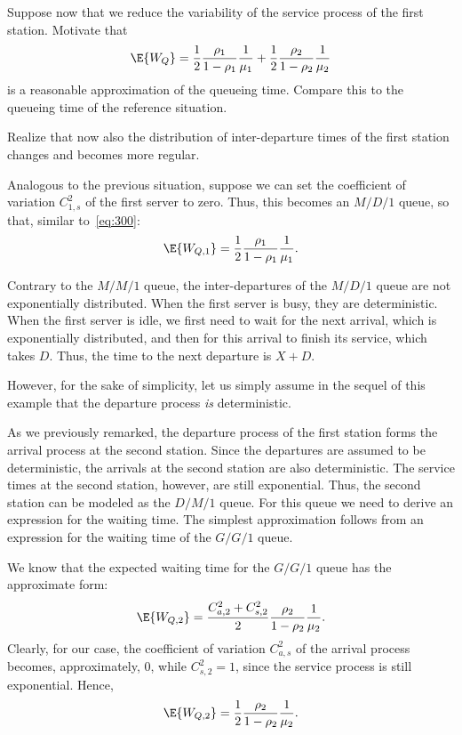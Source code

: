 \begin{exercise}
Suppose now that we reduce the variability of the service process of the first station.
Motivate that 
\begin{equation*}
  \E{W_Q}= \frac12\frac{\rho_1}{1-\rho_1} \frac1{\mu_1} +
  \frac12\frac{\rho_2}{1-\rho_2} \frac1{\mu_2}
\end{equation*}
is a reasonable approximation of the queueing time. Compare this to the queueing time of the reference situation.
\begin{hint}
    Realize that now also the distribution of inter-departure times of the first station changes and becomes more regular.
\end{hint}
\begin{solution}
Analogous to the previous situation, suppose we can set the coefficient of variation
$C_{1,s}^2$ of the first server to zero. Thus, this becomes an $M/D/1$
queue, so that, similar to~\cref{eq:300}:
\begin{equation*}
\E{W_{Q,1}} = \frac{1}2\frac{\rho_1}{1-\rho_1} \frac1{\mu_1}.
\end{equation*}

Contrary to the $M/M/1$ queue, the inter-departures of the $M/D/1$
queue are not exponentially distributed. When the first
server is busy, they are deterministic. When the first server is idle, we first
need to wait for the next arrival, which is exponentially distributed, and then for this arrival to finish its service, which
takes $D$. Thus, the time to the next departure is $X+D$.  

However, for the sake of simplicity, let us simply assume in the sequel of this
example that the departure process \emph{is} deterministic.

As we previously remarked, the departure process of the first station
forms the arrival process at the second station.  Since the departures
are assumed to be deterministic, the arrivals at the second station
are also deterministic.  The service times at the second station, however, are still
exponential.  Thus, the second station can be modeled as
the $D/M/1$ queue. For this queue we need to derive an expression for
the waiting time. The simplest approximation follows from an
expression for the waiting time of the $G/G/1$ queue.

We know that the expected waiting time for the $G/G/1$ queue has
the approximate form:
\begin{equation}\label{eq:500}
\E{W_{Q,2}} = \frac{C_{a,2}^2+C_{s,2}^2}2\frac{\rho_2}{1-\rho_2} \frac1{\mu_2}.
\end{equation}
Clearly, for our case, the coefficient of  variation $C_{a,s}^2$ of the
arrival process becomes, approximately, $0$, while $C_{s,2}^2 = 1$,
since the service process is still exponential. Hence,
\begin{equation}\label{eq:400}
\E{W_{Q,2}} = \frac12\frac{\rho_2}{1-\rho_2} \frac1{\mu_2}.
\end{equation}


\end{solution}
\end{exercise}
